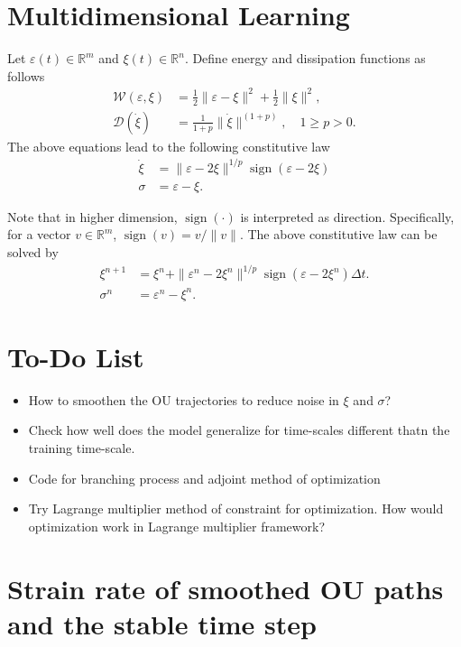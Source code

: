 \documentclass[11pt]{article}
\begin{document}
\section{Multidimensional Learning}
Let $\varepsilon(t) \in \mathbb{R}^m$ and $\xi(t) \in \mathbb{R}^n$. Define energy and dissipation functions as follows
\begin{align}
    \mathcal{W}(\varepsilon, \xi) & = \frac{1}{2} \|\varepsilon - \xi \|^2 + \frac{1}{2} \|\xi\|^2, \\
    \mathcal{D}(\dot{\xi})        & = \frac{1}{1+p} \|\dot{\xi}\|^{(1+p)}, \quad 1\geq p > 0.
\end{align}
The above equations lead to the following constitutive law
\begin{align}
    \dot{\xi} & = \|\varepsilon - 2\xi\|^{1/p}\operatorname{sign}(\varepsilon - 2\xi) \\
    \sigma    & = \varepsilon - \xi.
\end{align}

Note that in higher dimension, $\operatorname{sign}(\cdot)$ is interpreted as direction. Specifically, for a vector $v \in \mathbb{R}^m$, $\operatorname{sign}(v) = v / \|v\|$.
The above constitutive law can be solved by
\begin{align}
    \xi^{n+1}  & = \xi^n + \|\varepsilon^n - 2\xi^n\|^{1/p}\operatorname{sign}(\varepsilon - 2\xi^n) \Delta t. \\
    \sigma^{n} & = \varepsilon^n - \xi^n.
\end{align}
\section{To-Do List}
\begin{itemize}
    \item How to smoothen the OU trajectories to reduce noise in $\xi$ and $\sigma$?
    \item Check how well does the model generalize for time-scales different thatn the training time-scale.
    \item Code for branching process and adjoint method of optimization
    \item Try Lagrange multiplier method of constraint for optimization. How would optimization work in Lagrange multiplier framework?
\end{itemize}

\section{Strain rate of smoothed OU paths and the stable time step}
\label{sec:strain-rate-dt}
\end{document}

